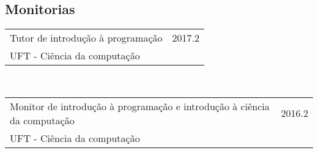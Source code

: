 \subsection*{Monitorias}

\begin{tabular}{p{11cm}|r}
  Tutor de introdução à programação & \textsc{2017.2} \\
  UFT - Ciência da computação & \\
\end{tabular}\\

\begin{tabular}{p{11cm}|r}
    Monitor de introdução à programação e introdução à ciência da computação & \textsc{2016.2} \\
    UFT - Ciência da computação & \\
  \end{tabular}\\
